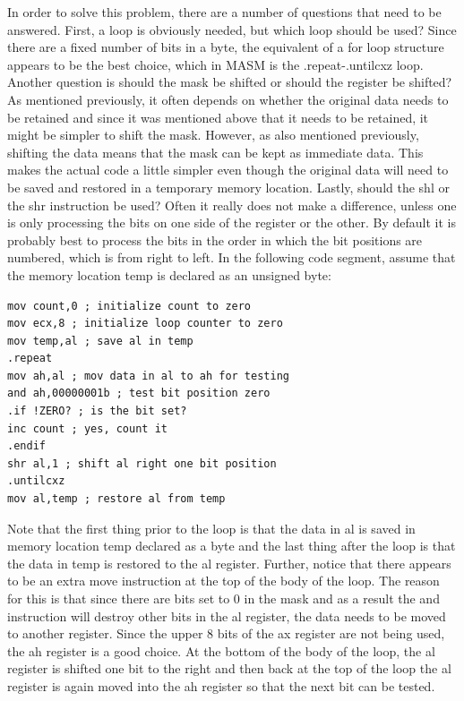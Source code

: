 \documentclass[10pt]{book}
\begin{document}
In order to solve this problem, there are a number of questions that need to be answered. First, a loop is obviously needed, but which loop should be used? Since there are a fixed number of bits in a byte, the equivalent of a for loop structure appears to be the best choice, which in MASM is the .repeat-.untilcxz loop. Another question is should the mask be shifted or should the register be shifted? As mentioned previously, it often depends on whether the original data needs to be retained and since it was mentioned above that it needs to be retained, it might be simpler to shift the mask. However, as also mentioned previously, shifting the data means that the mask can be kept as immediate data. This makes the actual code a little simpler even though the original data will need to be saved and restored in a temporary memory location. Lastly, should the shl or the shr instruction be used? Often it really does not make a difference, unless one is only processing the bits on one side of the register or the other. By default it is probably best to process the bits in the order in which the bit positions are numbered, which is from right to left. In the following code segment, assume that the memory location temp is declared as an unsigned byte:

\begin{verbatim}
mov count,0 ; initialize count to zero
mov ecx,8 ; initialize loop counter to zero
mov temp,al ; save al in temp
.repeat
mov ah,al ; mov data in al to ah for testing
and ah,00000001b ; test bit position zero
.if !ZERO? ; is the bit set?
inc count ; yes, count it
.endif
shr al,1 ; shift al right one bit position
.untilcxz
mov al,temp ; restore al from temp
\end{verbatim}

Note that the first thing prior to the loop is that the data in al is saved in memory location temp declared as a byte and the last thing after the loop is that the data in temp is restored to the al register. Further, notice that there appears to be an extra move instruction at the top of the body of the loop. The reason for this is that since there are bits set to 0 in the mask and as a result the and instruction will destroy other bits in the al register, the data needs to be moved to another register. Since the upper 8 bits of the ax register are not being used, the ah register is a good choice. At the bottom of the body of the loop, the al register is shifted one bit to the right and then back at the top of the loop the al register is again moved into the ah register so that the next bit can be tested.
\end{document}
